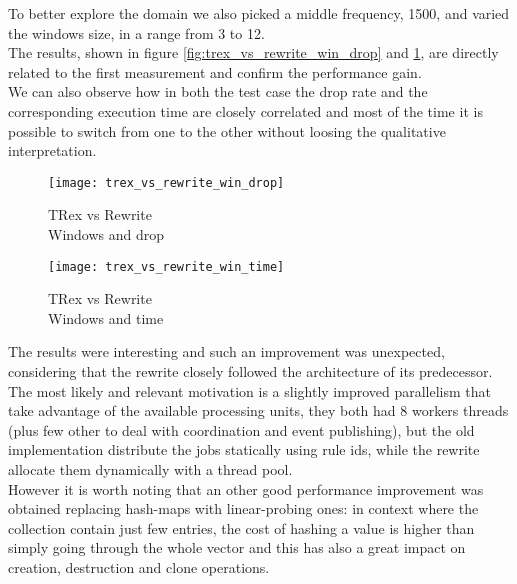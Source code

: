 To better explore the domain we also picked a middle frequency, 1500, and varied the windows size, in a range from 3 to 12.\\
The results, shown in figure \ref{fig:trex_vs_rewrite_win_drop} and \ref{fig:trex_vs_rewrite_win_time}, are directly related to the first measurement and confirm the performance gain.\\
We can also observe how in both the test case the drop rate and the corresponding execution time are closely correlated and most of the time it is possible to switch from one to the other without loosing the qualitative interpretation.
\begin{figure}[h]
\captionsetup{justification=centering}
\begin{minipage}{.5\textwidth}
  \centering
  \texttt{[image: trex\_vs\_rewrite\_win\_drop]}
  \caption{TRex vs Rewrite\\
  	Windows and drop}
  \label{fig:trex_vs_rewrite_win_drop}
\end{minipage}%
\begin{minipage}{.5\textwidth}
  \centering
  \texttt{[image: trex\_vs\_rewrite\_win\_time]}
  \caption{TRex vs Rewrite\\
  	Windows and time}
  \label{fig:trex_vs_rewrite_win_time}
\end{minipage}
\end{figure}

The results were interesting and such an improvement was unexpected, considering that the rewrite closely followed the architecture of its predecessor. The most likely and relevant motivation is a slightly improved parallelism that take advantage of the available processing units, they both had 8 workers threads (plus few other to deal with coordination and event publishing), but the old implementation distribute the jobs statically using rule ids, while the rewrite allocate them dynamically with a thread pool.\\
However it is worth noting that an other good performance improvement was obtained replacing hash-maps with linear-probing ones: in context where the collection contain just few entries, the cost of hashing a value is higher than simply going through the whole vector and this has also a great impact on creation, destruction and clone operations.

